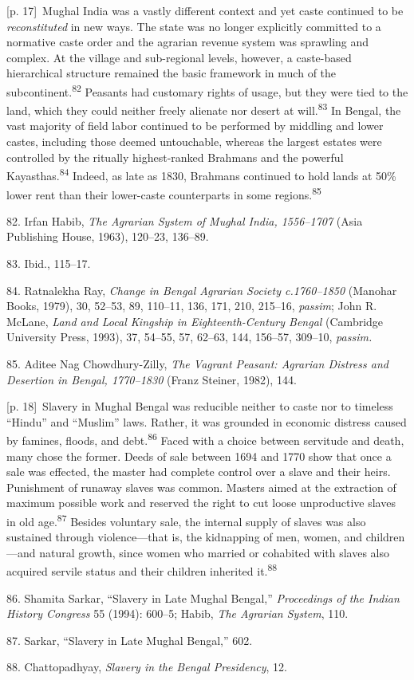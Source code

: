 \documentclass[10pt,a4paper]{article}
\begin{document}
{\scriptsize\color{gray} [p. 17]}\ Mughal India was a vastly different context and yet caste continued to be \textit{reconstituted} in new ways. The state was no longer explicitly committed to a normative caste order and the agrarian revenue system was sprawling and complex. At the village and sub-regional levels, however, a caste-based hierarchical structure remained the basic framework in much of the subcontinent.\nobreak\textsuperscript{82} Peasants had customary rights of usage, but they were tied to the land, which they could neither freely alienate nor desert at will.\nobreak\textsuperscript{83} In Bengal, the vast majority of field labor continued to be performed by middling and lower castes, including those deemed untouchable, whereas the largest estates were controlled by the ritually highest-ranked Brahmans and the powerful Kayasthas.\nobreak\textsuperscript{84} Indeed, as late as 1830, Brahmans continued to hold lands at 50\% lower rent than their lower-caste counterparts in some regions.\nobreak\textsuperscript{85}\par{\small 82. Irfan Habib, \textit{The Agrarian System of Mughal India, 1556–1707} (Asia Publishing House, 1963), 120–23, 136–89.\par}{\small 83. Ibid., 115–17.\par}{\small 84. Ratnalekha Ray, \textit{Change in Bengal Agrarian Society c.1760–1850} (Manohar Books, 1979), 30, 52–53, 89, 110–11, 136, 171, 210, 215–16, \textit{passim}; John R. McLane, \textit{Land and Local Kingship in Eighteenth-Century Bengal} (Cambridge University Press, 1993), 37, 54–55, 57, 62–63, 144, 156–57, 309–10, \textit{passim.}\par}{\small 85. Aditee Nag Chowdhury-Zilly, \textit{The Vagrant Peasant: Agrarian Distress and Desertion in Bengal, 1770–1830} (Franz Steiner, 1982), 144.\par}
{\scriptsize\color{gray} [p. 18]}\ Slavery in Mughal Bengal was reducible neither to caste nor to timeless “Hindu” and “Muslim” laws. Rather, it was grounded in economic distress caused by famines, floods, and debt.\nobreak\textsuperscript{86} Faced with a choice between servitude and death, many chose the former. Deeds of sale between 1694 and 1770 show that once a sale was effected, the master had complete control over a slave and their heirs. Punishment of runaway slaves was common. Masters aimed at the extraction of maximum possible work and reserved the right to cut loose unproductive slaves in old age.\nobreak\textsuperscript{87} Besides voluntary sale, the internal supply of slaves was also sustained through violence—that is, the kidnapping of men, women, and children—and natural growth, since women who married or cohabited with slaves also acquired servile status and their children inherited it.\nobreak\textsuperscript{88}\par{\small 86. Shamita Sarkar, “Slavery in Late Mughal Bengal,” \textit{Proceedings of the Indian History Congress} 55 (1994): 600–5; Habib, \textit{The Agrarian System}, 110.\par}{\small 87. Sarkar, “Slavery in Late Mughal Bengal,” 602.\par}{\small 88. Chattopadhyay, \textit{Slavery in the Bengal Presidency}, 12.\par}
\end{document}
